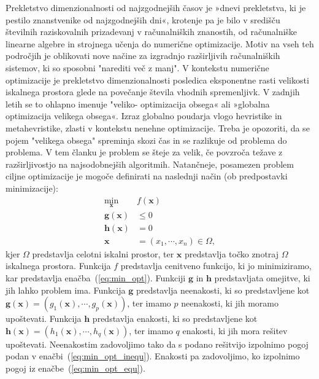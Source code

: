 Prekletstvo dimenzionalnosti od najzgodnejših časov je »dnevi prekletstva, ki je pestilo znanstvenike od najzgodnejših dni«, krotenje pa je bilo v središču številnih raziskovalnih prizadevanj v računalniških znanostih, od računalniške linearne algebre in strojnega učenja do numerične optimizacije.
Motiv na vseh teh področjih je oblikovati nove načine za izgradnjo razširljivih računalniških sistemov, ki so sposobni "narediti več z manj".
V kontekstu numerične optimizacije je prekletstvo dimenzionalnosti posledica eksponentne rasti velikosti iskalnega prostora glede na povečanje števila vhodnih spremenljivk.
V zadnjih letih se to ohlapno imenuje "veliko- optimizacija obsega« ali »globalna optimizacija velikega obsega«.
Izraz globalno poudarja vlogo hevristike in metahevristike, zlasti v kontekstu nenehne optimizacije.
Treba je opozoriti, da se pojem "velikega obsega" spreminja skozi čas in se razlikuje od problema do problema.
V tem članku je problem se šteje za velik, če povzroča težave z razširljivostjo na najsodobnejših algoritmih.
Natančneje, posamezen problem ciljne optimizacije je mogoče definirati na naslednji način (ob predpostavki minimizacije):
\begin{align}
	\min_{\mathbf{x}}&{f(\mathbf{x})} \label{eq:min_opt}\\
	\mathbf{g}(\mathbf{x}) &\leq 0 \label{eq:min_opt_inequ}\\
	\mathbf{h}(\mathbf{x}) &= 0 \label{eq:min_opt_equ}\\
	\mathbf{x} &= (x_1, \cdots, x_n) \in \Omega \label{eq:min_opt_space},
\end{align}
kjer $\Omega$ predstavlja celotni iskalni prostor, ter $\mathbf{x}$ predstavlja točko znotraj $\Omega$ iskalnega prostora.
Funkcija $f$ predstavlja cenitveno funkcijo, ki jo minimiziramo, kar predstavlja enačba~(\ref{eq:min_opt}).
Funkciji $\mathbf{g}$ in $\mathbf{h}$ predstavljata omejitve, ki jih lahko problem ima.
Funkcija $\mathbf{g}$ predstavlja neenakosti, ki so predstavljene kot $\mathbf{g}(\mathbf{x}) = (g_1(\mathbf{x}), \cdots, g_p(\mathbf{x}))$, ter imamo $p$ neenakosti, ki jih moramo upoštevati.
Funkcija $\mathbf{h}$ predstavlja enakosti, ki so predstavljene kot $\mathbf{h}(\mathbf{x}) = (h_1(\mathbf{x}), \cdots, h_q(\mathbf{x}))$, ter imamo $q$ enakosti, ki jih mora rešitev upoštevati.
Neenakostim zadovoljimo tako da s podano rešitvijo izpolnimo pogoj podan v enačbi~(\ref{eq:min_opt_inequ}).
Enakosti pa zadovoljimo, ko izpolnimo pogoj iz enačbe~(\ref{eq:min_opt_equ}).


